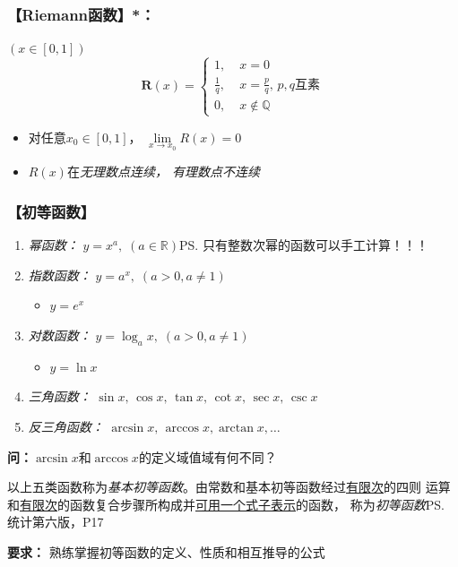 \subsubsection{\bf 【Riemann函数】*：} 

$(x\in[0,1])$
  $$\bm{R}(x) =\left\{
	\begin{array}{ll}
	1,\;&x=0\\
	\displaystyle\frac 1q,\;&x=\displaystyle\frac pq,\,p,q\mbox{互素}\\
	0,\;&x\notin\mathbb{Q}
	\end{array}
  \right. $$
  \begin{itemize}
    \item 对任意$x_0\in[0,1]$， $\lim\limits_{x\to x_0}R(x)=0$
    \vspace{1ex}
    \item $R(x)$在{\it 无理数点连续， 有理数点不连续}
  \end{itemize}

\subsubsection{【初等函数】}

\begin{enumerate}
  \item {\it 幂函数：} $y=x^a,\; (a\in\mathbb{R})$\ps{只有整数次幂的函数可以手工计算！！！}
  \item {\it 指数函数：} $y=a^x,\; (a>0,a\ne 1)$
  \begin{itemize}
    \item {$y=e^x$}
  \end{itemize}
  \item {\it 对数函数：} $y=\log_ax,\; (a>0,a\ne 1)$
  \begin{itemize}
    \item {$y=\ln x$}
  \end{itemize}
  \item {\it 三角函数：} $\sin x, \,\cos x,\, \tan x, \,\cot
  x,\, \sec x,\, \csc x$
  \item {\it 反三角函数：} $\arcsin x, \,\arccos x, \arctan x,
  \ldots$
\end{enumerate}
{\bf 问：}$\arcsin x$和$\arccos x$的定义域值域有何不同？

以上五类函数称为{\it 基本初等函数}。由常数和基本初等函数经过\underline{有限次}的四则
运算和\underline{有限次}的函数复合步骤所构成并\underline{可用一个式子表示}的函数，
称为{\it 初等函数}\ps{统计第六版，P17}

{\bf{要求：}} 熟练掌握初等函数的定义、性质和相互推导的公式

